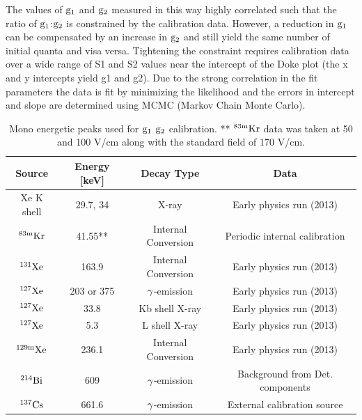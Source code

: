 The values of $\rm g_1$ and $\rm g_2$ measured in this way highly correlated such that the ratio of $\rm g_1$:$\rm g_2$ is constrained by the calibration data. However, a reduction in $\rm g_1$ can be compensated by an increase in $\rm g_2$ and still yield the same number of initial quanta and visa versa. Tightening the constraint requires calibration data over a wide range of S1 and S2 values near the intercept of the Doke plot (the x and y intercepts yield g1 and g2). Due to the strong correlation in the fit parameters the data is fit by minimizing the likelihood and the errors in intercept and slope are determined using MCMC (Markov Chain Monte Carlo). 



\begin{table}[h!]
\centering
\footnotesize
\begin{tabular}{|c|c|c|c|}
\hline
Source & Energy [keV] &Decay Type & Data \\ [0.5ex] %
\hline
Xe K shell  & 29.7, 34 	 		& X-ray							& Early physics run (2013)					\\ \hline
 $\rm ^{83m}Kr$ 	& 41.55**		& Internal Conversion		& Periodic internal calibration	\\ \hline
 $\rm ^{131}Xe$ 	& 163.9		& Internal Conversion			& Early physics run (2013) \\ \hline
$\rm ^{127}Xe$ 	& 203 or 375	& $\rm \gamma$-emission	& Early physics run (2013)\\ \hline
$\rm ^{127}Xe$		& 33.8			& Kb shell X-ray 				& Early physics run (2013)		\\ \hline
$\rm ^{127}Xe$	     & 5.3			& L shell X-ray 					& Early physics run (2013)\\ \hline
$\rm ^{129m}Xe$	& 236.1		& Internal Conversion 		& Early physics run (2013)	\\ \hline
$\rm ^{214}Bi	$	& 609 			& $\rm \gamma$-emission	& Background from Det. components			 \\ \hline
 $\rm ^{137}Cs$	& 661.6		&  $\rm \gamma$-emission 	& External calibration source			\\ [0.5ex] 
\hline
\end{tabular}
\caption{Mono energetic peaks used for $\rm g_1$ $\rm g_2$ calibration. ** $\rm^{83m}Kr$ data was taken at 50 and 100 V/cm along with the standard field of 170 V/cm.}
\label{table:Cal_lines}
\end{table}



